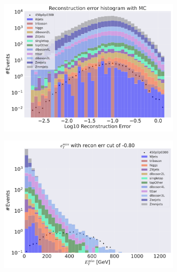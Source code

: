 \begin{figure}[H]
    \centering
    \begin{subfigure}{.49\textwidth}
        \includegraphics[width=\textwidth]{Figures/VAE_testing/small/3lep/b_data_recon_big_rm3_feats_sig_450p0p0300.pdf}
        \caption{ }
        \label{fig:VAE_3lep_small_450_2}
    \end{subfigure}
    \hfill
    \begin{subfigure}{.49\textwidth}
        \includegraphics[width=\textwidth]{Figures/VAE_testing/small/3lep/b_data_recon_big_rm3_feats_sig_450p0p0300_etmiss_recon_errcut_-0.80.pdf}
        \caption{}
        \label{fig:VAE_3lep_small_etmiss_450_2}
    \end{subfigure}

\end{figure}
